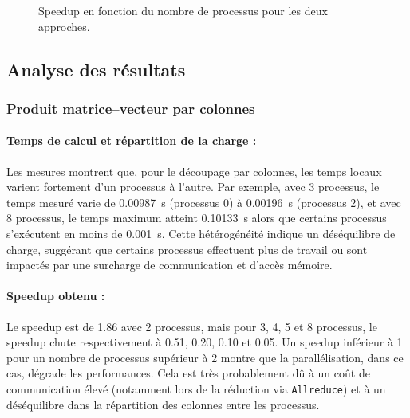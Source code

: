 \documentclass[a4paper,13pt]{book}
\begin{document}
\begin{figure}[ht]
  \centering
  \caption{Speedup en fonction du nombre de processus pour les deux approches.}
  \label{fig:speedup}
\end{figure}
\subsection{Analyse des résultats}

\subsubsection{Produit matrice--vecteur par colonnes}

\paragraph{Temps de calcul et répartition de la charge :} 
Les mesures montrent que, pour le découpage par colonnes, les temps locaux varient fortement d'un processus à l'autre. Par exemple, avec 3 processus, le temps mesuré varie de 0.00987~s (processus 0) à 0.00196~s (processus 2), et avec 8 processus, le temps maximum atteint 0.10133~s alors que certains processus s'exécutent en moins de 0.001~s. Cette hétérogénéité indique un déséquilibre de charge, suggérant que certains processus effectuent plus de travail ou sont impactés par une surcharge de communication et d'accès mémoire.

\paragraph{Speedup obtenu :} 
Le speedup est de 1.86 avec 2 processus, mais pour 3, 4, 5 et 8 processus, le speedup chute respectivement à 0.51, 0.20, 0.10 et 0.05. Un speedup inférieur à 1 pour un nombre de processus supérieur à 2 montre que la parallélisation, dans ce cas, dégrade les performances. Cela est très probablement dû à un coût de communication élevé (notamment lors de la réduction via \texttt{Allreduce}) et à un déséquilibre dans la répartition des colonnes entre les processus.
\end{document}
